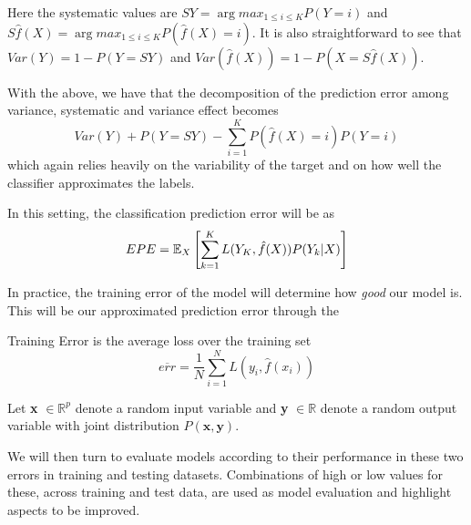 Here the systematic values are $SY = \arg max_{1\leq i \leq K} P(Y=i)$ and $S\hat{f}(X) = \arg max_{1\leq i \leq K} P(\hat{f}(X)=i)$. It is also straightforward to see that $Var(Y) = 1 - P(Y=SY)$ and $Var(\hat{f}(X)) = 1 - P(X = S\hat{f}(X)) $.

With the above, we have that the decomposition of the prediction error among variance, systematic and variance effect becomes
\begin{equation}
Var(Y) + P(Y=SY) - \sum_{i=1}^K P(\hat{f}(X) =i)P(Y=i)	
\end{equation}
	 which again relies heavily on the variability of the target and on how well the classifier approximates the labels.


In this setting, the classification prediction error will be as
\begin{equation}\label{classificationEPE}
EPE = \operatorname{\mathbb{E}}_X\left[ \sum_{k=1}^{K} L( Y_K , \hat{f}(X) ) P(Y_k|X) \right]
\end{equation}


In practice, the training error of the model will determine how \textit{good} our model is. This will be our approximated prediction error through the
\begin{definition}{Training Error}
is the average loss over the training set
$$ \overline{err} = \frac{1}{N} \sum_{i=1}^N L(y_i, \hat{f}(x_i) )$$
\end{definition}


Let \textbf{x} $\in \mathbb{R}^{p}$ denote a random input variable and \textbf{y} $\in \mathbb{R}$ denote a random output variable with joint distribution $P\left(\textbf{x},\textbf{y}\right)$.


We will then turn to evaluate models according to their performance in these two errors in training and testing datasets. Combinations of high or low values for these, across training and test data, are used as model evaluation and highlight aspects to be improved.

